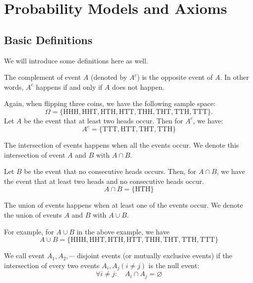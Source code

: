 \chapter{Probability Models and Axioms}

\section{Basic Definitions}
We will introduce some definitions here as well. 

\begin{definition}[Complement]
    The complement of event \(A\) (denoted by \(A^c\)) is the opposite event of \(A\). In other words, \(A^c\) happens if and only if \(A\) does not happen.
\end{definition}

Again, when flipping three coins, we have the following sample space:
\[
    \Omega = \{\text{HHH}, \text{HHT}, \text{HTH}, \text{HTT}, \text{THH}, \text{THT}, \text{TTH}, \text{TTT}\}.
\]
Let \(A\) be the event that at least two heads occur. Then for \(A^c\), we have:
\[
    A^c = \{\text{TTT}, \text{HTT}, \text{THT}, \text{TTH}\}
\]

\begin{definition}
    The intersection of events happens when all the events occur. We denote this intersection of event \(A\) and \(B\) with \(A \cap B\). 
\end{definition}

Let \(B\) be the event that no consecutive heads occurs. Then, for \(A \cap B\), we have the event that at least two heads and no consecutive heads occur.
\[
    A \cap B = \{\text{HTH}\}
\]

\begin{definition}
    The union of events happens when at least one of the events occur. We denote the union of events \(A\) and \(B\) with \(A \cup B\). 
\end{definition}

For example, for \(A \cup B\) in the above example, we have 
\[
    A \cup B = \{\text{HHH}, \text{HHT}, \text{HTH}, \text{HTT}, \text{THH}, \text{THT}, \text{TTH}, \text{TTT}\}
\]

\begin{definition}
    We call event \(A_1, A_2, \cdots\) disjoint events (or mutually exclusive events) if the intersection of every two events \(A_i, A_j (i \neq j)\) is the null event:
    \[
        \forall i \neq j:\quad A_i \cap A_j = \varnothing
    \]  
\end{definition}

